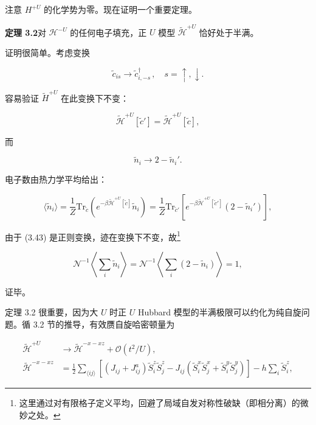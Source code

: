 注意 $H^{+U}$ 的化学势为零。现在证明一个重要定理。

\medskip
\noindent\textbf{定理 3.2}\quad 对 $\mathcal{H}^{-U}$ 的任何电子填充，正 $U$ 模型 $\tilde{\mathcal{H}}^{+U}$ 恰好处于半满。
\medskip

证明很简单。考虑变换

\begin{equation*}
\tilde {c} _ {is} \rightarrow \tilde {c} _ {i,-s} ^ {\dagger} \, , \quad s = \uparrow , \downarrow .
\tag{3.43}
\end{equation*}

容易验证 $\tilde{H}^{+U}$ 在此变换下不变：

\begin{equation*}
\tilde {\mathcal {H}} ^ {+U} [ \tilde {c} ' ] = \tilde {\mathcal {H}} ^ {+U} [ \tilde {c} ],
\tag{3.44}
\end{equation*}

而

\begin{equation*}
\tilde {n} _ {i} \rightarrow 2 - \tilde {n} _ {i} '.
\tag{3.45}
\end{equation*}

电子数由热力学平均给出：

\begin{equation*}
\langle \tilde {n} _ {i} \rangle = \frac {1}{Z} \mathrm{Tr}_{\tilde{c}} \left( e ^ {- \beta \tilde {\mathcal {H}} ^ {+U} [ \tilde {c} ]} \tilde {n} _ {i} \right) = \frac {1}{Z} \mathrm{Tr}_{\tilde{c}'} \left[ e ^ {- \beta \tilde {\mathcal {H}} ^ {+U} [ \tilde {c} ' ]} ( 2 - \tilde {n} _ {i} ' ) \right],
\tag{3.46}
\end{equation*}

由于 (3.43) 是正则变换，迹在变换下不变，故\footnote{这里通过对有限格子定义平均，回避了局域自发对称性破缺（即相分离）的微妙之处。}

\begin{equation*}
\mathcal {N} ^ {- 1} \left\langle \sum_ {i} \tilde {n} _ {i} \right\rangle = \mathcal {N} ^ {- 1} \left\langle \sum_ {i} ( 2 - \tilde {n} _ {i} ) \right\rangle = 1,
\tag{3.47}
\end{equation*}

证毕。

定理 3.2 很重要，因为大 $U$ 时正 $U$ Hubbard 模型的半满极限可以约化为纯自旋问题。循 3.2 节的推导，有效赝自旋哈密顿量为

\begin{align*}
\tilde {\mathcal {H}} ^ {+U} & \rightarrow \tilde {\mathcal {H}} ^ {-x-xz} + \mathcal {O} ( t ^ {2} / U ),\\
\tilde {\mathcal {H}} ^ {-x-xz} & = \frac {1}{2} \sum_ {\langle ij \rangle} \left[ ( J _ {ij} + J _ {ij} ^ {a} ) \tilde {S} _ {i} ^ {z} \tilde {S} _ {j} ^ {z} - J _ {ij} ( \tilde {S} _ {i} ^ {x} \tilde {S} _ {j} ^ {x} + \tilde {S} _ {i} ^ {y} \tilde {S} _ {j} ^ {y} ) \right] - h \sum_ {i} \tilde {S} _ {i} ^ {z},
\tag{3.48}
\end{align*}

